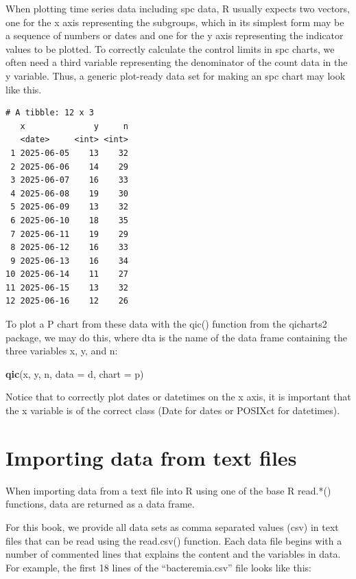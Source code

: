 \documentclass[
]{book}
\makeatletter
\newenvironment{Shaded}{\begin{snugshade}}{\end{snugshade}}
\newcommand{\AttributeTok}[1]{\textcolor[rgb]{0.13,0.29,0.53}{#1}}
\newcommand{\FunctionTok}[1]{\textcolor[rgb]{0.13,0.29,0.53}{\textbf{#1}}}
\newcommand{\NormalTok}[1]{#1}
\newcommand{\StringTok}[1]{\textcolor[rgb]{0.31,0.60,0.02}{#1}}
\newcommand*\pandocbounded[1]{%
  \sbox\pandoc@box{#1}%
  \Gscale@div\@tempa{\textheight}{\dimexpr\ht\pandoc@box+\dp\pandoc@box\relax}%
  \Gscale@div\@tempb{\linewidth}{\wd\pandoc@box}%
  \ifdim\@tempb\p@<\@tempa\p@\let\@tempa\@tempb\fi%
  \ifdim\@tempa\p@<\p@\scalebox{\@tempa}{\usebox\pandoc@box}%
  \else\usebox{\pandoc@box}%
  \fi%
}
\makeatother
\begin{document}
When plotting time series data including spc data, R usually expects two vectors, one for the x axis representing the subgroups, which in its simplest form may be a sequence of numbers or dates and one for the y axis representing the indicator values to be plotted. To correctly calculate the control limits in spc charts, we often need a third variable representing the denominator of the count data in the y variable. Thus, a generic plot-ready data set for making an spc chart may look like this.

\begin{verbatim}
# A tibble: 12 x 3
   x              y     n
   <date>     <int> <int>
 1 2025-06-05    13    32
 2 2025-06-06    14    29
 3 2025-06-07    16    33
 4 2025-06-08    19    30
 5 2025-06-09    13    32
 6 2025-06-10    18    35
 7 2025-06-11    19    29
 8 2025-06-12    16    33
 9 2025-06-13    16    34
10 2025-06-14    11    27
11 2025-06-15    13    32
12 2025-06-16    12    26
\end{verbatim}

To plot a P chart from these data with the qic() function from the qicharts2 package, we may do this, where dta is the name of the data frame containing the three variables x, y, and n:

\begin{Shaded}
\begin{Highlighting}[]
\FunctionTok{qic}\NormalTok{(x, y, n, }
    \AttributeTok{data  =}\NormalTok{ d, }
    \AttributeTok{chart =} \StringTok{\textquotesingle{}p\textquotesingle{}}\NormalTok{)}
\end{Highlighting}
\end{Shaded}

\pandocbounded{}

Notice that to correctly plot dates or datetimes on the x axis, it is important that the x variable is of the correct class (Date for dates or POSIXct for datetimes).

\section{Importing data from text files}\label{importing-data-from-text-files}

When importing data from a text file into R using one of the base R read.*() functions, data are returned as a data frame.

For this book, we provide all data sets as comma separated values (csv) in text files that can be read using the read.csv() function. Each data file begins with a number of commented lines that explains the content and the variables in data. For example, the first 18 lines of the ``bacteremia.csv'' file looks like this:
\end{document}
